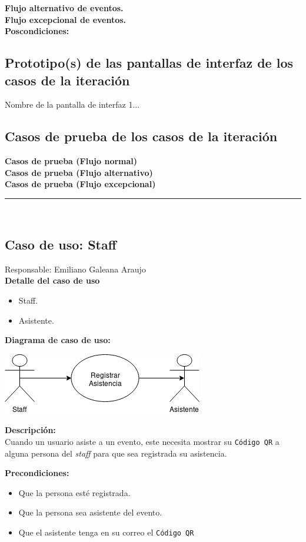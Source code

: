 \documentclass{article}
\newcommand{\newsubsection}[1]{
  \indent \textbf{#1}\\
}
\begin{document}
\newsubsection{Flujo alternativo de eventos.}

\newsubsection{Flujo excepcional de eventos.}

\newsubsection{Poscondiciones:}

\subsection{Prototipo(s) de las pantallas de interfaz de los casos de la iteración}
Nombre de la pantalla de interfaz 1... %
\subsection{Casos de prueba de los casos de la iteración}
\newsubsection{Casos de prueba (Flujo normal)}

\newsubsection{Casos de prueba (Flujo alternativo)}

\newsubsection{Casos de prueba (Flujo excepcional)}

\rule{1\textwidth}{.8pt}\\
\subsection{Caso de uso: Staff}
Responsable: Emiliano Galeana Araujo\\
\newsubsection{Detalle del caso de uso}
\begin{itemize}
\item Staff.
\item Asistente.
\end{itemize}

\newsubsection{Diagrama de caso de uso:}
\begin{center}
  \includegraphics{../imagenes/casoUsoStaff.png}
\end{center}

\newsubsection{Descripción:}
Cuando un usuario asiste a un evento, este necesita mostrar su \texttt{Código QR}
a alguna persona del \textit{staff} para que sea registrada su asistencia.

\newsubsection{Precondiciones:}

\begin{itemize}
\item Que la persona esté registrada.
\item Que la persona sea asistente del evento.
\item Que el asistente tenga en su correo el \texttt{Código QR}
\end{itemize}
\end{document}
